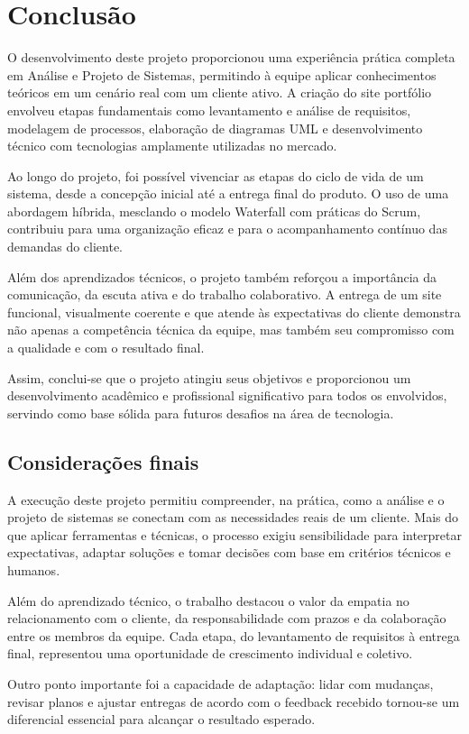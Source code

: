 \chapter{Conclusão}
\label{chap:conc}

O desenvolvimento deste projeto proporcionou uma experiência prática completa em Análise e Projeto de Sistemas, permitindo à equipe aplicar conhecimentos teóricos em um cenário real com um cliente ativo. A criação do site portfólio envolveu etapas fundamentais como levantamento e análise de requisitos, modelagem de processos, elaboração de diagramas UML e desenvolvimento técnico com tecnologias amplamente utilizadas no mercado.

Ao longo do projeto, foi possível vivenciar as etapas do ciclo de vida de um sistema, desde a concepção inicial até a entrega final do produto. O uso de uma abordagem híbrida, mesclando o modelo Waterfall com práticas do Scrum, contribuiu para uma organização eficaz e para o acompanhamento contínuo das demandas do cliente.

Além dos aprendizados técnicos, o projeto também reforçou a importância da comunicação, da escuta ativa e do trabalho colaborativo. A entrega de um site funcional, visualmente coerente e que atende às expectativas do cliente demonstra não apenas a competência técnica da equipe, mas também seu compromisso com a qualidade e com o resultado final.

Assim, conclui-se que o projeto atingiu seus objetivos e proporcionou um desenvolvimento acadêmico e profissional significativo para todos os envolvidos, servindo como base sólida para futuros desafios na área de tecnologia.

\section{Considerações finais}
\label{sec:consid}

A execução deste projeto permitiu compreender, na prática, como a análise e o projeto de sistemas se conectam com as necessidades reais de um cliente. Mais do que aplicar ferramentas e técnicas, o processo exigiu sensibilidade para interpretar expectativas, adaptar soluções e tomar decisões com base em critérios técnicos e humanos.

Além do aprendizado técnico, o trabalho destacou o valor da empatia no relacionamento com o cliente, da responsabilidade com prazos e da colaboração entre os membros da equipe. Cada etapa, do levantamento de requisitos à entrega final, representou uma oportunidade de crescimento individual e coletivo.

Outro ponto importante foi a capacidade de adaptação: lidar com mudanças, revisar planos e ajustar entregas de acordo com o feedback recebido tornou-se um diferencial essencial para alcançar o resultado esperado.

